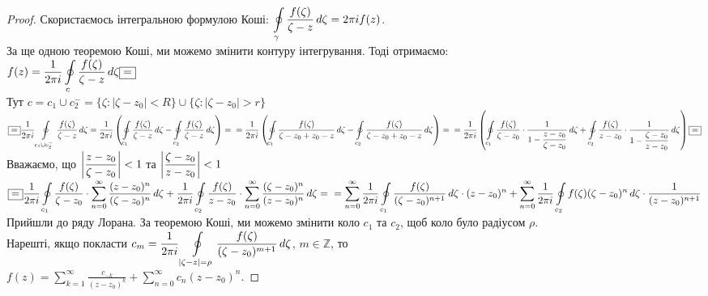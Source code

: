 \documentclass{math_library}
\begin{document}
\begin{proof}
Скористаємось інтегральною формулою Коші:
	$\displaystyle \oint\displaylimits_{\gamma} \frac{f(\zeta)}{\zeta-z}\,d\zeta = 2\pi i f(z)$.\\
	За ще одною теоремою Коші, ми можемо змінити контуру інтегрування. Тоді отримаємо:\\
	$f(z) = \displaystyle \frac{1}{2\pi i} \oint\displaylimits_{c} \frac{f(\zeta)}{\zeta-z}\,d\zeta \boxed{=}$\\
	Тут $c = c_1 \cup c_2^- = \{\zeta: |\zeta-z_0|<R\} \cup \{\zeta: |\zeta-z_0|>r\}$\\
	 $ \boxed{=} \displaystyle\frac{1}{2\pi i}\oint\displaylimits_{c_1 \cup c_2^-} \frac{f(\zeta)}{\zeta-z}\,d\zeta = \frac{1}{2\pi i} \left(\oint\displaylimits_{c_1} \frac{f(\zeta)}{\zeta-z}\,d\zeta - \oint\displaylimits_{c_2} \frac{f(\zeta)}{\zeta-z}\,d\zeta \right) = \\ = \frac{1}{2\pi i} \left(\oint\displaylimits_{c_1} \frac{f(\zeta)}{\zeta-z_0+z_0-z}\,d\zeta - \oint\displaylimits_{c_2} \frac{f(\zeta)}{\zeta-z_0+z_0-z}\,d\zeta \right)=\\
	=\frac{1}{2\pi i} \left(\oint\displaylimits_{c_1} \frac{f(\zeta)}{\zeta-z_0} \cdot \frac{1}{1- \displaystyle\frac{z-z_0}{\zeta-z_0}}\,d\zeta + \oint\displaylimits_{c_2} \frac{f(\zeta)}{z-z_0} \cdot \frac{1}{1- \displaystyle\frac{\zeta-z_0}{z-z_0}}\,d\zeta \right) \boxed{=}$\\
	Вважаємо, що $\displaystyle \abs{\frac{z-z_0}{\zeta - z_0}}<1$ та $\displaystyle \abs{\frac{\zeta-z_0}{z-z_0}}<1$\\
	$\boxed{=} \displaystyle\frac{1}{2\pi i}\oint\displaylimits_{c_1} \frac{f(\zeta)}{\zeta-z_0} \cdot \sum_{n=0}^{\infty} \frac{(z-z_0)^n}{(\zeta-z_0)^n} \,d\zeta + \displaystyle\frac{1}{2\pi i}\oint\displaylimits_{c_2} \frac{f(\zeta)}{z-z_0} \cdot \sum_{n=0}^{\infty} \frac{(\zeta-z_0)^n}{(z-z_0)^n} \,d\zeta = 
	\\ = \sum_{n=0}^{\infty} \frac{1}{2\pi i}\oint\displaylimits_{c_1} \frac{f(\zeta)}{(\zeta - z_0)^{n+1}} \,d\zeta \cdot (z-z_0)^n + \sum_{n=0}^{\infty} \frac{1}{2\pi i}\oint\displaylimits_{c_2} f(\zeta)(\zeta-z_0)^n \,d\zeta \cdot \frac{1}{(z-z_0)^{n+1}}$\\
	Прийшли до ряду Лорана. За теоремою Коші, ми можемо змінити коло $c_1$ та $c_2$, щоб коло було радіусом $\rho$.\\
	Нарешті, якщо покласти $c_m = \displaystyle\frac{1}{2\pi i}\oint\displaylimits_{|\zeta-z|=\rho} \frac{f(\zeta)}{(\zeta-z_0)^{m+1}} \,d\zeta$, $m \in \mathbb{Z}$, то\\ $f(z) = \displaystyle\sum_{k=1}^{\infty}\frac{c_{-k}}{(z-z_0)^k}  + \sum_{n=0}^{\infty} c_n(z-z_0)^n$.
\end{proof}
\end{document}
